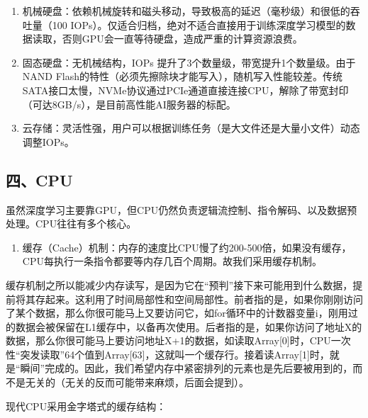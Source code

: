 \begin{enumerate}
\def\labelenumi{\arabic{enumi}.}
\item
  机械硬盘：依赖机械旋转和磁头移动，导致极高的延迟（毫秒级）和很低的吞吐量（100 IOPs）。仅适合归档，绝对不适合直接用于训练深度学习模型的数据读取，否则GPU会一直等待硬盘，造成严重的计算资源浪费。
\item
  固态硬盘：无机械结构，IOPs 提升了3个数量级，带宽提升1个数量级。由于NAND Flash的特性（必须先擦除块才能写入），随机写入性能较差。传统SATA接口太慢，NVMe协议通过PCIe通道直接连接CPU，解除了带宽封印（可达8GB/s），是目前高性能AI服务器的标配。
\item
  云存储：灵活性强，用户可以根据训练任务（是大文件还是大量小文件）动态调整IOPs。
\end{enumerate}

\hypertarget{ux56dbcpu}{%
\subsection{四、CPU}\label{ux56dbcpu}}

虽然深度学习主要靠GPU，但CPU仍然负责逻辑流控制、指令解码、以及数据预处理。CPU往往有多个核心。

\begin{enumerate}
\def\labelenumi{\arabic{enumi}.}
\tightlist
\item
  缓存（Cache）机制：内存的速度比CPU慢了约200-500倍，如果没有缓存，CPU每执行一条指令都要等内存几百个周期。故我们采用缓存机制。
\end{enumerate}

缓存机制之所以能减少内存读写，是因为它在``预判''接下来可能用到什么数据，提前将其存起来。这利用了时间局部性和空间局部性。前者指的是，如果你刚刚访问了某个数据，那么你很可能马上又要访问它，如for循环中的计数器变量i，刚用过的数据会被保留在L1缓存中，以备再次使用。后者指的是，如果你访问了地址X的数据，那么你很可能马上要访问地址X+1的数据，如读取Array{[}0{]}时，CPU一次性``突发读取''64个值到Array{[}63{]}，这就叫一个缓存行。接着读Array{[}1{]}时，就是``瞬间''完成的。因此，我们希望内存中紧密排列的元素也是先后要被用到的，而不是无关的（无关的反而可能带来麻烦，后面会提到）。

现代CPU采用金字塔式的缓存结构：

